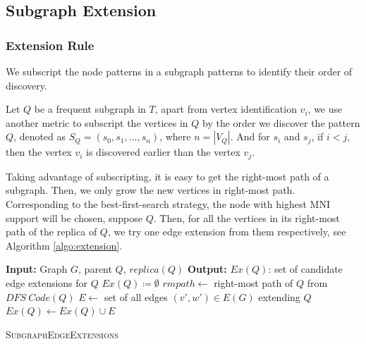 \subsection{Subgraph Extension}
\label{subsec:subgraph-ext}
\subsubsection{Extension Rule}
We subscript the node patterns in a subgraph patterns to identify their order of discovery.
\begin{defn}
	Let $Q$ be a frequent subgraph in $T$, apart from vertex identification $v_i$, we use another metric to subscript the vertices in $Q$ by the order we discover the pattern $Q$, denoted as $S_Q=(s_0,s_1,...,s_n)$, where $n=|V_Q|$. And for $s_i$ and $s_j$, if $i<j$, then the vertex $v_i$ is discovered earlier than the vertex $v_j$.
\end{defn}
Taking advantage of subscripting, it is easy to get the right-most path of a subgraph. Then, we only grow the new vertices in right-most path. Corresponding to the best-first-search strategy, the node with highest MNI support will be chosen, suppose $Q$. Then, for all the vertices in its right-most path of the replica of $Q$, we try one edge extension from them respectively, see Algorithm \ref{algo:extension}.

\begin{algorithm}
	\dontprintsemicolon
	\nonl \textbf{Input:} Graph $G$, parent $Q$, $replica(Q)$ \;
	\nonl \textbf{Output:} $Ex(Q)$: set of candidate edge extensions for $Q$\;
	$Ex(Q)\coloneq \emptyset$ \;
	$rmpath \leftarrow$ right-most path of $Q$ from $DFS\ Code(Q)$\;
	{
		{
			$E\leftarrow$ set of all edges $(v',w')\in E(G)$ extending $Q$\;
			$Ex(Q)\leftarrow Ex(Q)\cup E$
		}
	}
	\caption{\textsc{SubgraphEdgeExtensions}}\label{algo:extension}
\end{algorithm}

